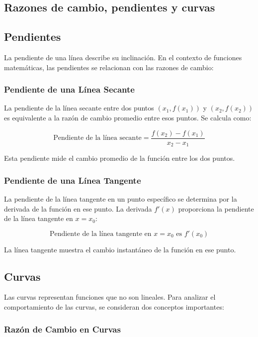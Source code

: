 \subsection{Razones de cambio, pendientes y curvas}
\subsection{Pendientes}

La pendiente de una línea describe su inclinación. En el contexto de funciones matemáticas, las pendientes se relacionan con las razones de cambio:

\subsubsection{Pendiente de una Línea Secante}

La pendiente de la línea secante entre dos puntos \((x_1, f(x_1))\) y \((x_2, f(x_2))\) es equivalente a la razón de cambio promedio entre esos puntos. Se calcula como:

\[
\text{Pendiente de la línea secante} = \frac{f(x_2) - f(x_1)}{x_2 - x_1}
\]

Esta pendiente mide el cambio promedio de la función entre los dos puntos.

\subsubsection{Pendiente de una Línea Tangente}

La pendiente de la línea tangente en un punto específico se determina por la derivada de la función en ese punto. La derivada \( f'(x) \) proporciona la pendiente de la línea tangente en \( x = x_0 \):

\[
\text{Pendiente de la línea tangente en } x = x_0 \text{ es } f'(x_0)
\]

La línea tangente muestra el cambio instantáneo de la función en ese punto.

\subsection{Curvas}

Las curvas representan funciones que no son lineales. Para analizar el comportamiento de las curvas, se consideran dos conceptos importantes:

\subsubsection{Razón de Cambio en Curvas}


